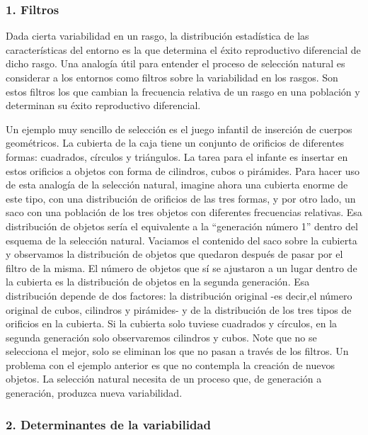 \documentclass[
  letterpaper,
]{book}
\begin{document}
\subsubsection{1. Filtros}\label{filtros}

Dada cierta variabilidad en un rasgo, la distribución estadística de las
características del entorno es la que determina el éxito reproductivo
diferencial de dicho rasgo. Una analogía útil para entender el proceso
de selección natural es considerar a los entornos como filtros sobre la
variabilidad en los rasgos. Son estos filtros los que cambian la
frecuencia relativa de un rasgo en una población y determinan su éxito
reproductivo diferencial.

Un ejemplo muy sencillo de selección es el juego infantil de inserción
de cuerpos geométricos. La cubierta de la caja tiene un conjunto de
orificios de diferentes formas: cuadrados, círculos y triángulos. La
tarea para el infante es insertar en estos orificios a objetos con forma
de cilindros, cubos o pirámides. Para hacer uso de esta analogía de la
selección natural, imagine ahora una cubierta enorme de este tipo, con
una distribución de orificios de las tres formas, y por otro lado, un
saco con una población de los tres objetos con diferentes frecuencias
relativas. Esa distribución de objetos sería el equivalente a la
``generación número 1'' dentro del esquema de la selección natural.
Vaciamos el contenido del saco sobre la cubierta y observamos la
distribución de objetos que quedaron después de pasar por el filtro de
la misma. El número de objetos que sí se ajustaron a un lugar dentro de
la cubierta es la distribución de objetos en la segunda generación. Esa
distribución depende de dos factores: la distribución original -es
decir,el número original de cubos, cilindros y pirámides- y de la
distribución de los tres tipos de orificios en la cubierta. Si la
cubierta solo tuviese cuadrados y círculos, en la segunda generación
solo observaremos cilindros y cubos. Note que no se selecciona el mejor,
solo se eliminan los que no pasan a través de los filtros. Un problema
con el ejemplo anterior es que no contempla la creación de nuevos
objetos. La selección natural necesita de un proceso que, de generación
a generación, produzca nueva variabilidad.

\subsubsection{2. Determinantes de la
variabilidad}\label{determinantes-de-la-variabilidad}
\end{document}
